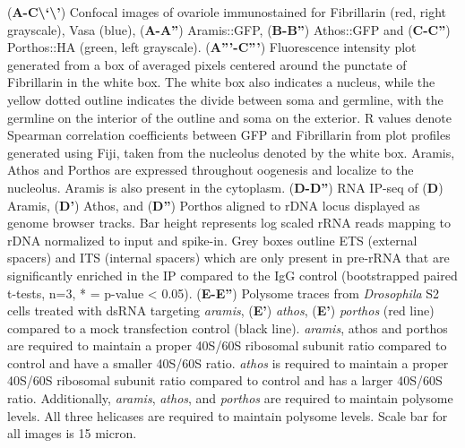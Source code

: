 \documentclass[12pt,oneside]{reedthesis}
\begin{document}
\setlength\parindent{0pt}(\textbf{A-C\textbackslash{}`\textbackslash{}'}) Confocal images of ovariole immunostained for Fibrillarin (red, right grayscale), Vasa (blue), (\textbf{A-A''}) Aramis::GFP, (\textbf{B-B''}) Athos::GFP and (\textbf{C-C''}) Porthos::HA (green, left grayscale). (\textbf{A'''-C'''}) Fluorescence intensity plot generated from a box of averaged pixels centered around the punctate of Fibrillarin in the white box. The white box also indicates a nucleus, while the yellow dotted outline indicates the divide between soma and germline, with the germline on the interior of the outline and soma on the exterior. R values denote Spearman correlation coefficients between GFP and Fibrillarin from plot profiles generated using Fiji, taken from the nucleolus denoted by the white box. Aramis, Athos and Porthos are expressed throughout oogenesis and localize to the nucleolus. Aramis is also present in the cytoplasm. (\textbf{D-D''}) RNA IP-seq of (\textbf{D}) Aramis, (\textbf{D'}) Athos, and (\textbf{D''}) Porthos aligned to rDNA locus displayed as genome browser tracks. Bar height represents log scaled rRNA reads mapping to rDNA normalized to input and spike-in. Grey boxes outline ETS (external spacers) and ITS (internal spacers) which are only present in pre-rRNA that are significantly enriched in the IP compared to the IgG control (bootstrapped paired t-tests, n=3, * = p-value \textless{} 0.05). (\textbf{E-E''}) Polysome traces from \emph{Drosophila} S2 cells treated with dsRNA targeting \emph{aramis}, (\textbf{E'}) \emph{athos}, (\textbf{E'}) \emph{porthos} (red line) compared to a mock transfection control (black line). \emph{aramis}, athos and porthos are required to maintain a proper 40S/60S ribosomal subunit ratio compared to control and have a smaller 40S/60S ratio. \emph{athos} is required to maintain a proper 40S/60S ribosomal subunit ratio compared to control and has a larger 40S/60S ratio. Additionally, \emph{aramis}, \emph{athos}, and \emph{porthos} are required to maintain polysome levels. All three helicases are required to maintain polysome levels. Scale bar for all images is 15 micron.

\textbf{\hfill\break
}
\end{document}

